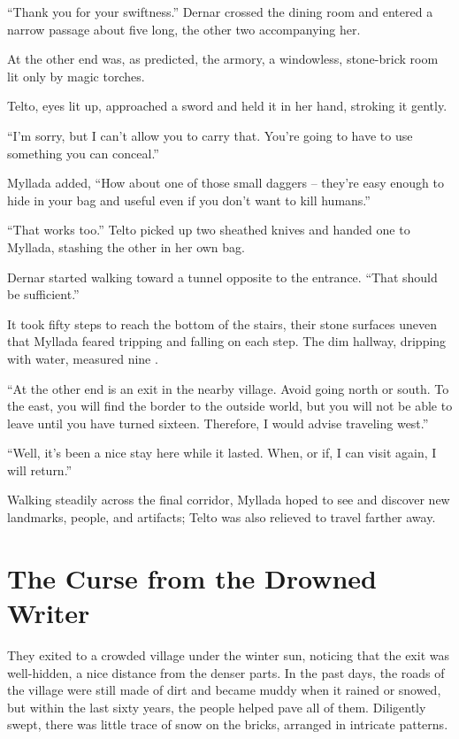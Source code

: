 ``Thank you for your swiftness.'' Dernar crossed the dining room and entered a narrow passage about five \vetyn{} long, the other two accompanying her.

At the other end was, as predicted, the armory, a windowless, stone-brick room lit only by magic torches.

Telto, eyes lit up, approached a sword and held it in her hand, stroking it gently.

``I'm sorry, but I can't allow you to carry that. You're going to have to use something you can conceal.''

Myllada added, ``How about one of those small daggers -- they're easy enough to hide in your bag and useful even if you don't want to kill humans.''

``That works too.'' Telto picked up two sheathed knives and handed one to Myllada, stashing the other in her own bag.

Dernar started walking toward a tunnel opposite to the entrance. ``That should be sufficient.''

It took fifty steps to reach the bottom of the stairs, their stone surfaces uneven that Myllada feared tripping and falling on each step. The dim hallway, dripping with water, measured nine \eletyn.

``At the other end is an exit in the nearby village. Avoid going north or south. To the east, you will find the border to the outside world, but you will not be able to leave until you have turned sixteen. Therefore, I would advise traveling west.''

``Well, it's been a nice stay here while it lasted. When, or if, I can visit again, I will return.''

Walking steadily across the final corridor, Myllada hoped to see and discover new landmarks, people, and artifacts; Telto was also relieved to travel farther away.

\chapter{The Curse from the Drowned Writer}

They exited to a crowded village under the winter sun, noticing that the exit was well-hidden, a nice distance from the denser parts. In the past days, the roads of the village were still made of dirt and became muddy when it rained or snowed, but within the last sixty years, the people helped pave all of them. Diligently swept, there was little trace of snow on the bricks, arranged in intricate patterns.

